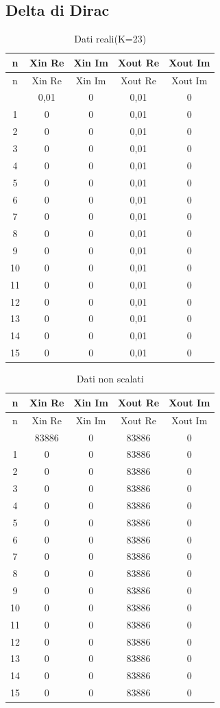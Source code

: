 \documentclass[a4paper, titlepage]{article}
\begin{document}
\subsection{Delta di Dirac } \label{tab:delta}
\begin{longtable}{*5c}
\caption{Dati reali(K=23)}
\label{}\\
\toprule
n & Xin Re & Xin Im & Xout Re & Xout Im \\
\midrule
\endfirsthead
n & Xin Re & Xin Im & Xout Re & Xout Im \\
\midrule
\endhead
\midrule
\endfoot
\bottomrule
\endlastfoot
0 & 0,01 & 0 & 0,01 & 0\\
1 & 0    & 0 & 0,01 & 0 \\
2 & 0    & 0 & 0,01 & 0 \\
3 & 0    & 0 & 0,01 & 0 \\
4 & 0    & 0 & 0,01 & 0 \\
5 & 0    & 0 & 0,01 & 0 \\
6 & 0    & 0 & 0,01 & 0 \\
7 & 0    & 0 & 0,01 & 0 \\
8 & 0    & 0 & 0,01 & 0 \\
9 & 0    & 0 & 0,01 & 0 \\
10& 0    & 0 & 0,01 & 0 \\
11& 0    & 0 & 0,01 & 0 \\
12& 0    & 0 & 0,01 & 0 \\
13& 0    & 0 & 0,01 & 0 \\
14& 0    & 0 & 0,01 & 0 \\
15 & 0 & 0 & 0,01 & 0 \\ 
\end{longtable}
\begin{longtable}{*5c}
\caption{Dati non scalati}
\label{}\\
\toprule
n & Xin Re & Xin Im & Xout Re & Xout Im \\
\midrule
\endfirsthead
n & Xin Re & Xin Im & Xout Re & Xout Im \\
\midrule
\endhead
\midrule
\endfoot
\bottomrule
\endlastfoot
0 & 83886 & 0 & 83886 & 0\\
1 & 0    & 0 & 83886 & 0 \\
2 & 0    & 0 & 83886 & 0 \\
3 & 0    & 0 & 83886 & 0 \\
4 & 0    & 0 & 83886 & 0 \\
5 & 0    & 0 & 83886 & 0 \\
6 & 0    & 0 & 83886 & 0 \\
7 & 0    & 0 & 83886 & 0 \\
8 & 0    & 0 & 83886 & 0 \\
9 & 0    & 0 & 83886 & 0 \\
10& 0    & 0 & 83886 & 0 \\
11& 0    & 0 & 83886 & 0 \\
12& 0    & 0 & 83886 & 0 \\
13& 0    & 0 & 83886 & 0 \\
14& 0    & 0 & 83886 & 0 \\
15 & 0 & 0 & 83886 & 0 \\ 
\end{longtable}
\end{document}
